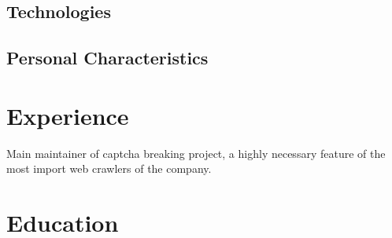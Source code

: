 \documentclass[letterpaper]{twentysecondcv} %
\begin{document}
\subsection{Technologies}

\subsection{Personal Characteristics}


\section{Experience}

\begin{twenty} %
	{}
	{}
	{Main maintainer of captcha breaking project, a highly necessary feature of the most
	import web crawlers of the company.}
\end{twenty}


% 


\section{Education}
\end{document}
